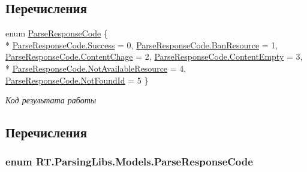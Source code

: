 \subsection*{Перечисления}
\begin{DoxyCompactItemize}
\item 
enum \hyperlink{namespace_r_t_1_1_parsing_libs_1_1_models_a7941eaea5a5a6680ee94d4b34a5cf9ef}{Parse\+Response\+Code} \{ \\*
\hyperlink{namespace_r_t_1_1_parsing_libs_1_1_models_a7941eaea5a5a6680ee94d4b34a5cf9efa505a83f220c02df2f85c3810cd9ceb38}{Parse\+Response\+Code.\+Success} = 0, 
\hyperlink{namespace_r_t_1_1_parsing_libs_1_1_models_a7941eaea5a5a6680ee94d4b34a5cf9efa7d42ab672fe4c968e726d7ea65ce8ab4}{Parse\+Response\+Code.\+Ban\+Resource} = 1, 
\hyperlink{namespace_r_t_1_1_parsing_libs_1_1_models_a7941eaea5a5a6680ee94d4b34a5cf9efabece6ab883cc5b9f5da0ce1e510aa7a7}{Parse\+Response\+Code.\+Content\+Chage} = 2, 
\hyperlink{namespace_r_t_1_1_parsing_libs_1_1_models_a7941eaea5a5a6680ee94d4b34a5cf9efa266eac857b2b6c0699e36bd61c6ac00d}{Parse\+Response\+Code.\+Content\+Empty} = 3, 
\\*
\hyperlink{namespace_r_t_1_1_parsing_libs_1_1_models_a7941eaea5a5a6680ee94d4b34a5cf9efaa6ce52e397059af52041cb679334651e}{Parse\+Response\+Code.\+Not\+Available\+Resource} = 4, 
\hyperlink{namespace_r_t_1_1_parsing_libs_1_1_models_a7941eaea5a5a6680ee94d4b34a5cf9efa5fa868a7917df75189439af1d7084b69}{Parse\+Response\+Code.\+Not\+Found\+Id} = 5
 \}
\begin{DoxyCompactList}\small\item\em Код результата работы \end{DoxyCompactList}\end{DoxyCompactItemize}


\subsection{Перечисления}
\hypertarget{namespace_r_t_1_1_parsing_libs_1_1_models_a7941eaea5a5a6680ee94d4b34a5cf9ef}{
\subsubsection[{Parse\+Response\+Code}]{\setlength{\rightskip}{0pt plus 5cm}enum {\bf R\+T.\+Parsing\+Libs.\+Models.\+Parse\+Response\+Code}}}\label{namespace_r_t_1_1_parsing_libs_1_1_models_a7941eaea5a5a6680ee94d4b34a5cf9ef}


